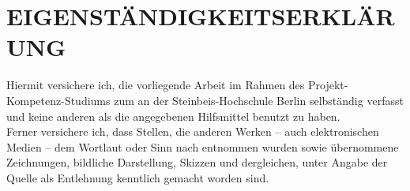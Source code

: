 \thispagestyle{empty}

\section*{EIGENSTÄNDIGKEITSERKLÄRUNG}
Hiermit versichere ich, die vorliegende Arbeit im Rahmen des Projekt-Kompetenz-Studiums zum \SCMTstudyprogramregular an der Steinbeis-Hochschule Berlin selbständig verfasst und keine anderen als die angegebenen Hilfsmittel benutzt zu haben.\\[0.5em]
Ferner versichere ich, dass Stellen, die anderen Werken – auch elektronischen Medien – dem Wortlaut oder Sinn nach entnommen wurden sowie übernommene Zeichnungen, bildliche Darstellung, Skizzen und dergleichen, unter Angabe der Quelle als Entlehnung kenntlich gemacht worden sind.

\vspace*{4em}
\begin{flushleft}
	\makebox[.4\textwidth]{\hrulefill}\hfill \makebox[.4\textwidth]{\hrulefill}\\
	\makebox[.4\textwidth]{\SCMTdatetime}\hfill
	\\
\end{flushleft}


